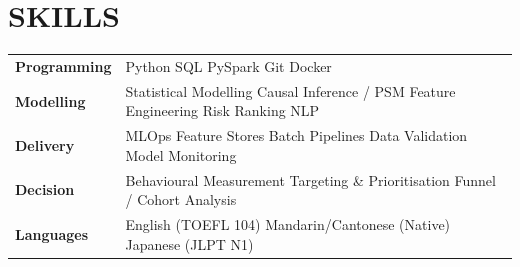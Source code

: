 \documentclass[a4paper,10pt]{article}
\begin{document}
\section{SKILLS}
\begin{tabular}{@{}p{2.5cm}p{14.5cm}@{}}
\textbf{Programming} & Python \textperiodcentered{} SQL \textperiodcentered{} PySpark \textperiodcentered{} Git \textperiodcentered{} Docker \\[0.5pt]
\textbf{Modelling} & Statistical Modelling \textperiodcentered{} Causal Inference / PSM \textperiodcentered{} Feature Engineering \textperiodcentered{} Risk Ranking \textperiodcentered{} NLP \\[0.5pt]
\textbf{Delivery} & MLOps \textperiodcentered{} Feature Stores \textperiodcentered{} Batch Pipelines \textperiodcentered{} Data Validation \textperiodcentered{} Model Monitoring \\[0.5pt]
\textbf{Decision} & Behavioural Measurement \textperiodcentered{} Targeting \& Prioritisation \textperiodcentered{} Funnel / Cohort Analysis \\[0.5pt]
\textbf{Languages} & English (TOEFL 104) \textperiodcentered{} Mandarin/Cantonese (Native) \textperiodcentered{} Japanese (JLPT N1) \\
\end{tabular}
\end{document}
